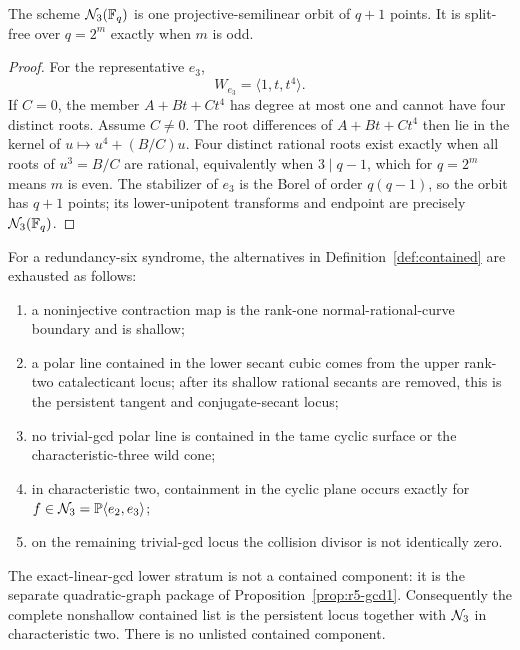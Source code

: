 \begin{proposition}\label{prop:r6-nucleus}%
%
The scheme $\mathcal N_3(\mathbb F_q)$ is one projective-semilinear orbit of $q+1$
points.  It is split-free over $q=2^m$ exactly when $m$ is odd.
\end{proposition}

\begin{proof}
For the representative $e_3$,
\[
       W_{e_3}=\langle1,t,t^4\rangle.
\]
If \(C=0\), the member \(A+Bt+Ct^4\) has degree at most one and
cannot have four distinct roots.  Assume \(C\ne0\).  The root
differences of $A+Bt+Ct^4$ then lie in the kernel of
$u\mapsto u^4+(B/C)u$.  Four distinct rational roots exist exactly
when all roots of $u^3=B/C$ are rational, equivalently when
$3\mid q-1$, which for $q=2^m$ means $m$ is even.  The stabilizer of
$e_3$ is the Borel of order $q(q-1)$, so the orbit has $q+1$ points;
its lower-unipotent transforms and endpoint are precisely
$\mathcal N_3(\mathbb F_q)$.
\end{proof}

\begin{proposition}
\label{prop:r6-contained}%
%
For a redundancy-six syndrome, the alternatives in
Definition~\ref{def:contained} are exhausted as follows:
\begin{enumerate}[label=\textup{(\roman*)}]
\item a noninjective contraction map is the rank-one
      normal-rational-curve boundary and is shallow;
\item a polar line contained in the lower secant cubic comes from the
      upper rank-two catalecticant locus; after its shallow rational
      secants are removed, this is the persistent tangent and
      conjugate-secant locus;
\item no trivial-gcd polar line is contained in the tame cyclic
      surface or the characteristic-three wild cone;
\item in characteristic two, containment in the cyclic plane occurs
      exactly for \(f\in\mathcal N_3=\mathbb P\langle e_2,e_3\rangle\);
\item on the remaining trivial-gcd locus the collision divisor
      is not identically zero.
\end{enumerate}
The exact-linear-gcd lower stratum is not a contained component: it is
the separate quadratic-graph package of
Proposition~\ref{prop:r5-gcd1}.
Consequently the complete nonshallow contained list is the persistent
locus together with \(\mathcal N_3\) in characteristic two.  There is no
unlisted contained component.
\end{proposition}

